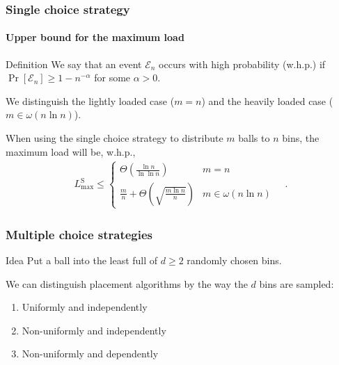 \documentclass[serif,professionalfonts]{beamer}
\newcommand\load{L_{\mathrm{max}}}
\newcommand\loadS{\load^{\mathrm{S}}}
\begin{document}
\begin{frame}
\frametitle{Single choice strategy}
\framesubtitle{Upper bound for the maximum load}

\begin{exampleblock}{Definition}
We say that an event $\mathcal E_n$ occurs \alert{with high probability} (w.h.p.) if $\Pr\left[\mathcal E_n \right] \geq 1 - n^{-\alpha}$ for some $\alpha > 0$.
\end{exampleblock}

\pause
\medskip
We distinguish the \alert{lightly loaded} case ($m = n$) and the \alert{heavily loaded} case ($m \in \omega(n\ln n)$).

\medskip
\begin{theorem}
When using the single choice strategy to distribute $m$ balls to $n$ bins, the maximum load will be, w.h.p.,
\begin{align*}
\loadS \leq 
	\begin{cases}
    \Theta\left(\frac{\ln n}{\ln\ln n}\right)           & m = n \\
    \frac{m}{n} + \Theta\left(\sqrt{\frac{m\ln n}{n}} \right)              & m \in \omega(n \ln n)
    \end{cases} \quad .
\end{align*}
\end{theorem}


\end{frame}

\begin{frame}
\frametitle{Multiple choice strategies}
\begin{exampleblock}{Idea}
Put a ball into the \alert{least full} of $d\geq2$ randomly chosen bins.
\end{exampleblock}

\bigskip
We can distinguish placement algorithms by the way the $d$ \alert{bins are sampled}:
\begin{enumerate}
\item Uniformly and independently
\item Non-uniformly and independently
\item Non-uniformly and dependently
\end{enumerate}
\end{frame}
\end{document}
